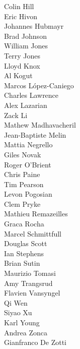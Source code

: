 \documentclass[PICOReport.tex]{subfiles}
\begin{document}
{\begin{multicols}{4}
Colin Hill                      \\
Eric Hivon                      \\
Johannes Hubmayr                \\
Brad Johnson                    \\
William Jones                   \\
Terry Jones                     \\
Lloyd Knox                      \\
Al Kogut                        \\
Marcos L\'{o}pez-Caniego        \\
Charles Lawrence                \\
Alex Lazarian                   \\
Zack Li                         \\
Mathew Madhavacheril            \\
Jean-Baptiste Melin             \\
Mattia Negrello                 \\
Giles Novak                     \\
Roger O'Brient                  \\
Chris Paine                     \\
Tim Pearson                     \\
Levon Pogosian                  \\
Clem Pryke                      \\
Mathieu Remazeilles             \\
Graca Rocha                     \\
Marcel Schmittfull              \\
Douglas Scott                   \\
Ian Stephens                    \\
Brian Sutin                     \\
Maurizio Tomasi                 \\
Amy Trangsrud                   \\
Flavien Vansyngel               \\
Qi Wen                          \\
Siyao Xu                        \\
Karl Young                      \\
Andrea Zonca                    \\
Gianfranco De Zotti            
\end{multicols}
}
\end{document}

